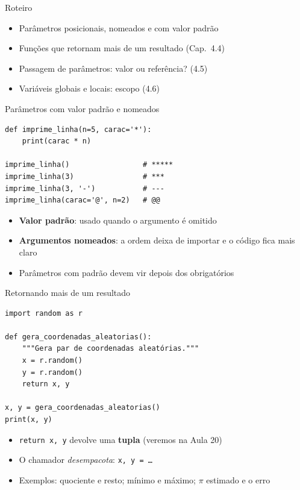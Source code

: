 \documentclass[aspectratio=169,10pt,t]{beamer}
\begin{document}
\capa

\begin{frame}{Roteiro}
  \begin{itemize}
    \item Parâmetros posicionais, nomeados e com valor padrão
    \item Funções que retornam mais de um resultado (Cap.~4.4)
    \item Passagem de parâmetros: valor ou referência? (4.5)
    \item Variáveis globais e locais: escopo (4.6)
  \end{itemize}
\end{frame}

\begin{frame}[fragile]{Parâmetros com valor padrão e nomeados}
\begin{lstlisting}
def imprime_linha(n=5, carac='*'):
    print(carac * n)

imprime_linha()                 # *****
imprime_linha(3)                # ***
imprime_linha(3, '-')           # ---
imprime_linha(carac='@', n=2)   # @@
\end{lstlisting}
  \begin{itemize}
    \item \textbf{Valor padrão}: usado quando o argumento é omitido
    \item \textbf{Argumentos nomeados}: a ordem deixa de importar e o código fica mais claro
    \item Parâmetros com padrão devem vir \alert{depois} dos obrigatórios
  \end{itemize}
\end{frame}

\begin{frame}[fragile]{Retornando mais de um resultado}
\begin{lstlisting}
import random as r

def gera_coordenadas_aleatorias():
    """Gera par de coordenadas aleatórias."""
    x = r.random()
    y = r.random()
    return x, y

x, y = gera_coordenadas_aleatorias()
print(x, y)
\end{lstlisting}
  \begin{itemize}
    \item \texttt{return x, y} devolve uma \textbf{tupla} (veremos na Aula 20)
    \item O chamador \emph{desempacota}: \texttt{x, y = \ldots}
    \item Exemplos: quociente e resto; mínimo e máximo; \(\pi\) estimado e o erro
  \end{itemize}
\end{frame}
\end{document}

